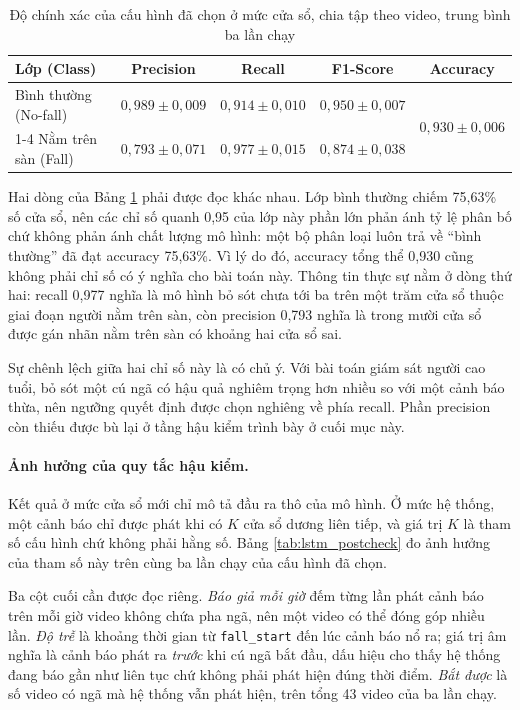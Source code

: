 \begin{table}[htbp]
\centering
\caption{Độ chính xác của cấu hình đã chọn ở mức cửa sổ, chia tập theo video, trung bình ba lần chạy}
\label{tab:lstm_benchmark}
\small
\begin{tabular}{|l|c|c|c|c|}
\hline
\textbf{Lớp (Class)} & \textbf{Precision} & \textbf{Recall} & \textbf{F1-Score} & \textbf{Accuracy} \\
\hline
Bình thường (No-fall) & $0{,}989\pm0{,}009$ & $0{,}914\pm0{,}010$ & $0{,}950\pm0{,}007$ & \multirow{2}{*}{$0{,}930\pm0{,}006$} \\
\cline{1-4}
Nằm trên sàn (Fall) & $0{,}793\pm0{,}071$ & $0{,}977\pm0{,}015$ & $0{,}874\pm0{,}038$ & \\
\hline
\end{tabular}
\end{table}

Hai dòng của Bảng \ref{tab:lstm_benchmark} phải được đọc khác nhau. Lớp bình thường chiếm 75,63\% số cửa sổ, nên các chỉ số quanh 0,95 của lớp này phần lớn phản ánh tỷ lệ phân bố chứ không phản ánh chất lượng mô hình: một bộ phân loại luôn trả về ``bình thường'' đã đạt accuracy 75,63\%. Vì lý do đó, accuracy tổng thể 0,930 cũng không phải chỉ số có ý nghĩa cho bài toán này. Thông tin thực sự nằm ở dòng thứ hai: recall 0,977 nghĩa là mô hình bỏ sót chưa tới ba trên một trăm cửa sổ thuộc giai đoạn người nằm trên sàn, còn precision 0,793 nghĩa là trong mười cửa sổ được gán nhãn nằm trên sàn có khoảng hai cửa sổ sai.

Sự chênh lệch giữa hai chỉ số này là có chủ ý. Với bài toán giám sát người cao tuổi, bỏ sót một cú ngã có hậu quả nghiêm trọng hơn nhiều so với một cảnh báo thừa, nên ngưỡng quyết định được chọn nghiêng về phía recall. Phần precision còn thiếu được bù lại ở tầng hậu kiểm trình bày ở cuối mục này.

\paragraph{Ảnh hưởng của quy tắc hậu kiểm.}
Kết quả ở mức cửa sổ mới chỉ mô tả đầu ra thô của mô hình. Ở mức hệ thống, một cảnh báo chỉ được phát khi có $K$ cửa sổ dương liên tiếp, và giá trị $K$ là tham số cấu hình chứ không phải hằng số. Bảng \ref{tab:lstm_postcheck} đo ảnh hưởng của tham số này trên cùng ba lần chạy của cấu hình đã chọn.

Ba cột cuối cần được đọc riêng. \textit{Báo giả mỗi giờ} đếm từng lần phát cảnh báo trên mỗi giờ video không chứa pha ngã, nên một video có thể đóng góp nhiều lần. \textit{Độ trễ} là khoảng thời gian từ \texttt{fall\_start} đến lúc cảnh báo nổ ra; giá trị âm nghĩa là cảnh báo phát ra \emph{trước} khi cú ngã bắt đầu, dấu hiệu cho thấy hệ thống đang báo gần như liên tục chứ không phải phát hiện đúng thời điểm. \textit{Bắt được} là số video có ngã mà hệ thống vẫn phát hiện, trên tổng 43 video của ba lần chạy.

